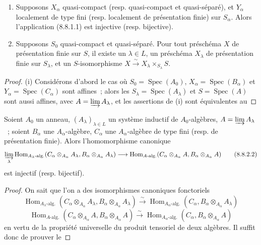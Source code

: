 \begin{theorem}[8.8.2]
\begin{enumerate}
\item[(i)] Supposons $X_\alpha$ quasi-compact (resp. quasi-compact et
quasi-séparé), et $Y_\alpha$ localement de type fini (resp. localement de
présentation finie) sur $S_\alpha$. Alors l'application (8.8.1.1) est
injective (resp. bijective).
\item[(ii)] Supposons $S_0$ quasi-compact et quasi-séparé. Pour tout préschéma
$X$ de présentation finie sur $S$, il existe un $\lambda\in L$, un préschéma
$X_\lambda$ de présentation finie sur $S_\lambda$, et un $S$-isomorphisme
$X\xrightarrow{\sim}X_\lambda\times_{S_\lambda}S$.
\end{enumerate}
\end{theorem}

\begin{proof}
(i) Considérons d'abord le cas où $S_0=\operatorname{Spec}(A_0)$,
$X_\alpha=\operatorname{Spec}(B_\alpha)$ et
$Y_\alpha=\operatorname{Spec}(C_\alpha)$ sont affines~; alors les
$S_\lambda=\operatorname{Spec}(A_\lambda)$ et $S=\operatorname{Spec}(A)$ sont
aussi affines, avec $A=\varinjlim A_\lambda$, et les assertions de (i) sont
équivalentes au
\end{proof}

\begin{lemma}[8.8.2.1]
\label{IV.8.8.2.1-fr}
Soient $A_0$ un anneau, $(A_\lambda)_{\lambda\in L}$ un système inductif de
$A_0$-algèbres, $A=\varinjlim A_\lambda$~; soient $B_\alpha$ une
$A_\alpha$-algèbre, $C_\alpha$ une $A_\alpha$-algèbre de type fini (resp. de
présentation finie). Alors l'homomorphisme canonique
\begin{equation}
\varinjlim_\lambda
\operatorname{Hom}_{A_\lambda\text{-alg.}}
  (C_\alpha\otimes_{A_\alpha}A_\lambda,
   B_\alpha\otimes_{A_\alpha}A_\lambda)
\longrightarrow
\operatorname{Hom}_{A\text{-alg.}}
  (C_\alpha\otimes_{A_\alpha}A,
   B_\alpha\otimes_{A_\alpha}A)
\tag{8.8.2.2}\label{IV.8.8.2.2-fr}
\end{equation}
est injectif (resp. bijectif).
\end{lemma}

\begin{proof}
On sait que l'on a des isomorphismes canoniques fonctoriels
\[
\operatorname{Hom}_{A_\lambda\text{-alg.}}
 (C_\alpha\otimes_{A_\alpha}A_\lambda,
  B_\alpha\otimes_{A_\alpha}A_\lambda)
\xrightarrow{\sim}
\operatorname{Hom}_{A_\alpha\text{-alg.}}
 (C_\alpha,B_\alpha\otimes_{A_\alpha}A_\lambda)
\]
\[
\operatorname{Hom}_{A\text{-alg.}}
 (C_\alpha\otimes_{A_\alpha}A,
  B_\alpha\otimes_{A_\alpha}A)
\xrightarrow{\sim}
\operatorname{Hom}_{A_\alpha\text{-alg.}}
 (C_\alpha,B_\alpha\otimes_{A_\alpha}A)
\]
en vertu de la propriété universelle du produit tensoriel de deux algèbres. Il
suffit donc de prouver le
\end{proof}


